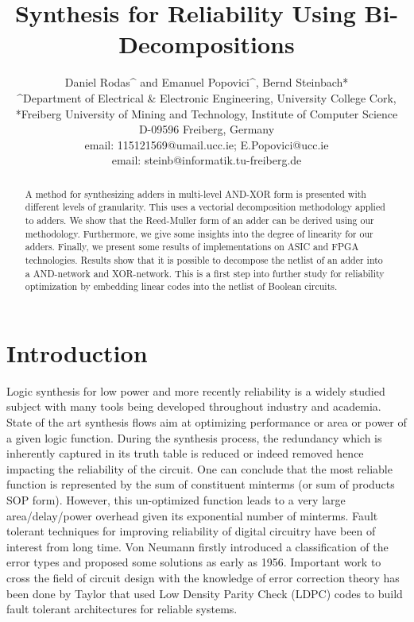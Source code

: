 \documentclass[a4paper]{article}
\title{Synthesis for Reliability Using Bi-Decompositions}
\author{Daniel Rodas\^{} and Emanuel Popovici\^{}, Bernd Steinbach*\\
\^{}Department of Electrical \& Electronic Engineering, University College Cork,\\
*Freiberg University of Mining and Technology, Institute of Computer Science\\D-09596 Freiberg, Germany\\
email: 115121569@umail.ucc.ie; E.Popovici@ucc.ie\\
email: steinb@informatik.tu-freiberg.de
}
\date{}
\begin{document}
\maketitle


\begin{abstract}
A method for synthesizing adders in multi-level AND-XOR form is presented with different levels of granularity. This uses a vectorial decomposition methodology applied to adders. We show that the Reed-Muller form of an adder can be derived using our methodology. Furthermore, we give some insights into the degree of linearity for our adders. Finally, we present some results of implementations on ASIC and FPGA technologies. Results show that it is possible to decompose the netlist of an adder into a AND-network and XOR-network. This is a first step into further study for reliability optimization by embedding linear codes into the netlist of Boolean circuits. 
\end{abstract}


\section{Introduction}

Logic synthesis for low power and more recently reliability is a widely studied subject with many tools being developed throughout industry and academia. State of the art synthesis flows aim at optimizing performance or area or power of a given logic function. During the synthesis process, the redundancy which is inherently captured in its truth table is reduced or indeed removed hence impacting the reliability of the circuit. One can conclude that the most reliable function is represented by the sum of constituent minterms (or sum of products SOP form). However, this un-optimized function leads to a very large area/delay/power overhead given its exponential number of minterms.  Fault tolerant techniques for improving  reliability of digital circuitry have been of interest from long time. Von Neumann \cite{Neumann56} firstly introduced a classification of the error types and proposed some solutions as early as 1956. Important work to cross the field of circuit design with the knowledge of error correction theory has been done by Taylor \cite{Taylor68a, Taylor68b} that used Low Density Parity Check (LDPC) codes to build fault tolerant architectures for reliable systems.
\end{document}
